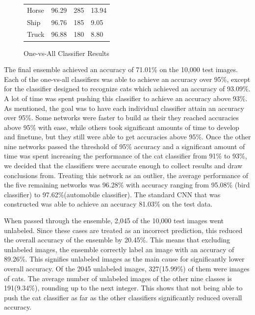\documentclass[10pt,twocolumn,letterpaper]{article}
\begin{document}
\begin{figure}[H]
\begin{table}[H]
\begin{tabular}{llll}
			Horse          & 96.29                                                            & 285                                                              & 13.94                                                                    \\
			Ship           & 96.76                                                            & 185                                                              & 9.05                                                                     \\
			Truck          & 96.88                                                            & 180                                                              & 8.80                                                                    
		\end{tabular}
	\end{table}
	\caption{One-vs-All Classifier Results}
\end{figure}

The final ensemble achieved an accuracy of 71.01\% on the 10,000 test images.  Each of the one-vs-all classifiers was able to achieve an accuracy over 95\%, except for the classifier designed to recognize cats which achieved an accuracy of 93.09\%. A lot of time was spent pushing this classifier to achieve an accuracy above 93\%. As mentioned, the goal was to have each individual classifier attain an accuracy over 95\%. Some networks were faster to build as their they reached accuracies above 95\% with ease, while others took significant amounts of time to develop and finetune, but they still were able to get accuracies above 95\%. Once the other nine networks passed the threshold of 95\% accuracy and a significant amount of time was spent increasing the performance of the cat classifier from 91\% to 93\%, we decided that the classifiers were accurate enough to collect results and draw conclusions from. Treating this network as an outlier, the average performance of the five remaining networks was 96.28\% with accuracy ranging from 95.08\% (bird classifier) to 97.62\%(automobile classifier). The standard CNN that was constructed was able to achieve an accuracy 81.03\% on the test data.

When passed through the ensemble, 2,045 of the 10,000 test images went unlabeled. Since these cases are treated as an incorrect prediction, this reduced the overall accuracy of the ensemble by 20.45\%.  This means that excluding unlabeled images, the ensemble correctly label an image with an accuracy of 89.26\%. This signifies unlabeled images as the main cause for significantly lower overall accuracy. Of the 2045 unlabeled images, 327(15.99\%) of them were images of cats. The average number of unlabeled images of the other nine classes is 191(9.34\%), rounding up to the next integer. This shows that not being able to push the cat classifier as far as the other classifiers significantly reduced overall accuracy.
\end{document}
